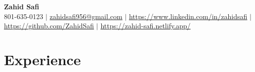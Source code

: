 \documentclass[letterpaper,1pt]{article}
\begin{document}
\begin{center}
  \textbf{\Huge Zahid Safi} \\ \vspace{1pt}
  \small 801-635-0123 $|$ \href{mailto:zahidsafi956@gmail.com}{{zahidsafi956@gmail.com}} $|$
  \href{https://www.linkedin.com/in/zahidsafi}{{https://www.linkedin.com/in/zahidsafi}} $|$
  \href{https://github.com/ZahidSafi}{{https://github.com/ZahidSafi}} $|$
  \href{https://zahid-safi.netlify.app/}{https://zahid-safi.netlify.app/}
\end{center}



\section{\textbf{Experience}}
\end{document}
